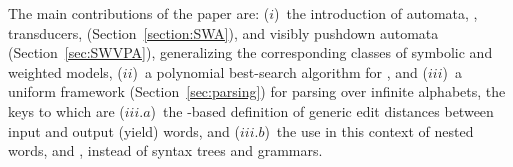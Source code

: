 
The main contributions of the paper are: 
($i$)~the introduction of automata, \SWA, transducers, \SWT (Section~\ref{section:SWA}),
and visibly pushdown automata \SWVPA (Section~\ref{sec:SWVPA}),
generalizing the corresponding classes of symbolic and weighted models, 
($ii$)~a polynomial best-search algorithm for \SWVPA, %
and ($iii$)~a uniform framework (Section~\ref{sec:parsing}) for parsing over infinite alphabets, 
the keys to which are 
($iii.a$)~the \SWT-based definition of generic edit distances between input and output (yield) words,
and ($iii.b$)~the use in this context of nested words, and \SWVPA, 
instead of syntax trees and grammars. %
%


